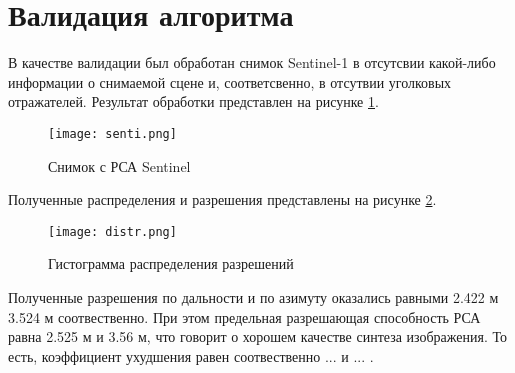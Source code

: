 \section{Валидация алгоритма}

	В качестве валидации был обработан снимок Sentinel-1 в отсутсвии какой-либо информации о снимаемой сцене и, соответсвенно, в отсутвии уголковых отражателей. Результат обработки представлен на рисунке \ref{fig:senti}.
	
\begin{figure}[ht]
    \centering
    \texttt{[image: senti.png]}
    \caption{Снимок с РСА Sentinel}
    \label{fig:senti}
\end{figure}

	Полученные распределения и разрешения представлены на рисунке \ref{fig:distr}.	

\begin{figure}[ht]
    \centering
    \texttt{[image: distr.png]}
    \caption{Гистограмма распределения разрешений}
    \label{fig:distr}
\end{figure}

	Полученные разрешения по дальности и по азимуту оказались равными 2.422 м 3.524 м соотвественно. При этом предельная разрешающая способность РСА равна 2.525 м и 3.56 м, что говорит о хорошем качестве синтеза изображения. То есть, коэффициент ухудшения равен соотвественно ... и ... .	

\newpage
